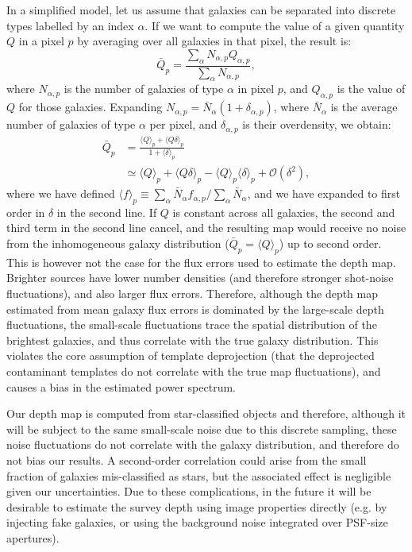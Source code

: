 \documentclass[a4paper,11pt]{article}
\begin{document}
  In a simplified model, let us assume that galaxies can be separated into discrete types labelled by an index $\alpha$. If we want to compute the value of a given quantity $Q$ in a pixel $p$ by averaging over all galaxies in that pixel, the result is:
  \begin{equation}
    \bar{Q}_p = \frac{\sum_\alpha N_{\alpha,p}Q_{\alpha,p}}{\sum_\alpha N_{\alpha,p}},
  \end{equation}
  where $N_{\alpha,p}$ is the number of galaxies of type $\alpha$ in pixel $p$, and $Q_{\alpha,p}$ is the value of $Q$ for those galaxies. Expanding $N_{\alpha,p}=\bar{N}_\alpha(1+\delta_{\alpha,p})$, where $\bar{N}_\alpha$ is the average number of galaxies of type $\alpha$ per pixel, and $\delta_{\alpha,p}$ is their overdensity, we obtain:
  \begin{align}\nonumber
    \bar{Q}_p&=\frac{\langle Q\rangle_p+\langle Q\delta\rangle_p}{1+\langle \delta\rangle_p}\\
             &\simeq\langle Q\rangle_p+\langle Q\delta\rangle_p-\langle Q\rangle_p\langle\delta\rangle_p+\mathcal{O}(\delta^2),
  \end{align}
  where we have defined $\langle f\rangle_p\equiv \sum_\alpha \bar{N}_\alpha f_{\alpha,p}/\sum_\alpha \bar{N}_\alpha$, and we have expanded to first order in $\delta$ in the second line. If $Q$ is constant across all galaxies, the second and third term in the second line cancel, and the resulting map would receive no noise from the inhomogeneous galaxy distribution ($\bar{Q}_p=\langle Q\rangle_p$) up to second order. This is however not the case for the flux errors used to estimate the depth map. Brighter sources have lower number densities (and therefore stronger shot-noise fluctuations), and also larger flux errors. Therefore, although the depth map estimated from mean galaxy flux errors is dominated by the large-scale depth fluctuations, the small-scale fluctuations trace the spatial distribution of the brightest galaxies, and thus correlate with the true galaxy distribution. This violates the core assumption of template deprojection (that the deprojected contaminant templates do not correlate with the true map fluctuations), and causes a bias in the estimated power spectrum.
  
  Our depth map is computed from star-classified objects and therefore, although it will be subject to the same small-scale noise due to this discrete sampling, these noise fluctuations do not correlate with the galaxy distribution, and therefore do not bias our results. A second-order correlation could arise from the small fraction of galaxies mis-classified as stars, but the associated effect is negligible given our uncertainties. Due to these complications, in the future it will be desirable to estimate the survey depth using image properties directly (e.g. by injecting fake galaxies, or using the background noise integrated over PSF-size apertures).
\end{document}
